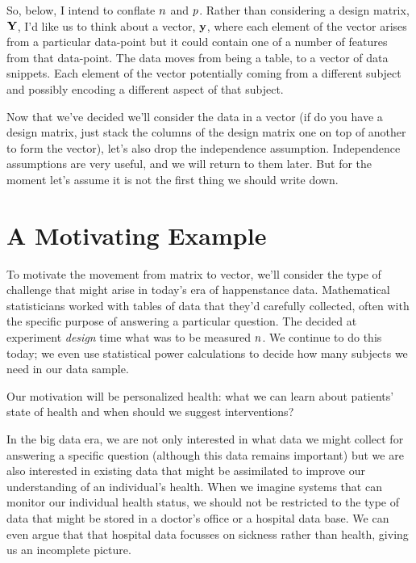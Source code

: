 \documentclass[a4paperpaper,]{article}
\begin{document}
So, below, I intend to conflate \(n\) and \(p\). Rather
than considering a design matrix, \(\mathbf{Y}\), I'd like us to think
about a vector, \(\mathbf{ y}\), where each element of the vector arises
from a particular data-point but it could contain one of a number of
features from that data-point. The data moves from being a table, to a
vector of data snippets. Each element of the vector potentially coming
from a different subject and possibly encoding a different aspect of
that subject.

Now that we've decided we'll consider the data in a vector (if do you
have a design matrix, just stack the columns of the design matrix one on
top of another to form the vector), let's also drop the independence
assumption. Independence assumptions are very useful, and we will return
to them later. But for the moment let's assume it is not the first thing
we should write down.

\hypertarget{a-motivating-big-data-example}{%
\section{A Motivating Example}\label{a-motivating-big-data-example}}


To motivate the movement from matrix to vector, we'll consider the type
of challenge that might arise in today's era of happenstance data.
Mathematical statisticians worked with tables of data that they'd
carefully collected, often with the specific purpose of answering a
particular question. The decided at experiment \emph{design} time what
was to be measured \(n\). We continue to do this today; we even
use statistical power calculations to decide how many subjects we need
in our data sample.

Our motivation will be personalized health: what we can learn about
patients' state of health and when should we suggest interventions?

In the big data era, we are not only interested in what data we might
collect for answering a specific question (although this data remains
important) but we are also interested in existing data that might be
assimilated to improve our understanding of an individual's health. When
we imagine systems that can monitor our individual health status, we
should not be restricted to the type of data that might be stored in a
doctor's office or a hospital data base. We can even argue that that
hospital data focusses on sickness rather than health, giving us an
incomplete picture.
\end{document}
